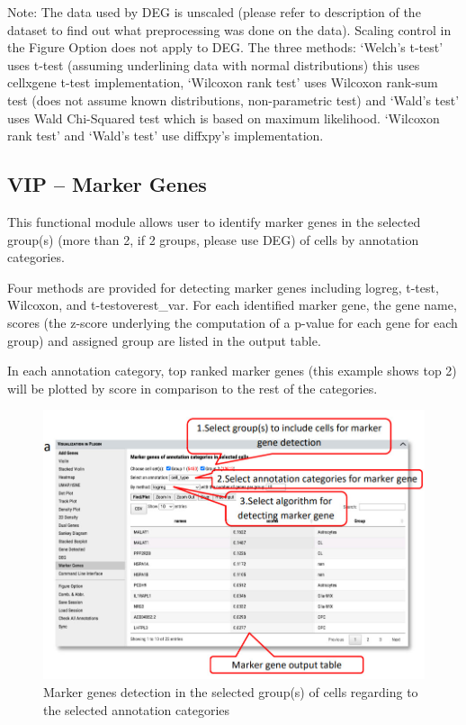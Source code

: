 \documentclass[
]{article}
\begin{document}
Note: The data used by DEG is unscaled (please refer to description of the dataset to find out what preprocessing was done on the data). Scaling control in the Figure Option does not apply to DEG. The three methods: `Welch's t-test' uses t-test (assuming underlining data with normal distributions) this uses cellxgene t-test implementation, `Wilcoxon rank test' uses Wilcoxon rank-sum test (does not assume known distributions, non-parametric test) and `Wald's test' uses Wald Chi-Squared test which is based on maximum likelihood. `Wilcoxon rank test' and `Wald's test' use diffxpy's implementation.

\hypertarget{vip-marker-genes}{%
\subsection{VIP -- Marker Genes}\label{vip-marker-genes}}

This functional module allows user to identify marker genes in the selected group(s) (more than 2, if 2 groups, please use DEG) of cells by annotation categories.

Four methods are provided for detecting marker genes including logreg, t-test, Wilcoxon, and t-testoverest\_var. For each identified marker gene, the gene name, scores (the z-score underlying the computation of a p-value for each gene for each group) and assigned group are listed in the output table.

In each annotation category, top ranked marker genes (this example shows top 2) will be plotted by score in comparison to the rest of the categories.

\begin{figure}
\centering
\includegraphics{figures/F20A.jpg}
\caption{Marker genes detection in the selected group(s) of cells regarding to the selected annotation categories}
\end{figure}
\end{document}
